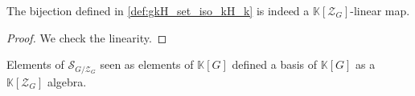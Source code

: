 \begin{definition}
    \label{def:gkH_set_iso_kH_module}
    \leanok
    The bijection defined in \ref{def:gkH_set_iso_kH_k} is indeed a $\mathbb{K}[\mathcal{Z}_G]$-linear map.
    \begin{proof}    
        \leanok
        We check the linearity.
    \end{proof}
\end{definition}

\begin{proposition}
    \label{prop:MonoidAlgebra_MulAction_basis}
    \uses{}
    \leanok
    Elements of $\mathcal{S}_{G/\mathcal{Z}_G}$ seen as elements of $\mathbb{K}[G]$ defined 
    a basis of $\mathbb{K}[G]$ as a $\mathbb{K}[\mathcal{Z}_G]$ algebra.
\end{proposition}
